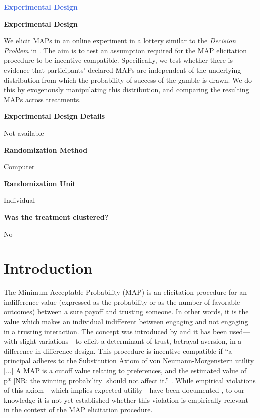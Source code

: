 \large \noindent \textcolor{RoyalBlue}{\textbf{Experimental Design}}

\normalsize \noindent \textcolor{NavyBlue}{\textbf{Experimental Design}}

We elicit MAPs in an online experiment in a lottery similar to the \textit{Decision Problem} in \cite{Bohnet2004}.
The aim is to test an assumption required for the MAP elicitation procedure to be incentive-compatible.
Specifically, we test whether there is evidence that participants' declared MAPs are independent of the underlying distribution from which the probability of success of the gamble is drawn.
We do this by exogenously manipulating this distribution, and comparing the resulting MAPs across treatments.

\noindent \textcolor{NavyBlue}{\textbf{Experimental Design Details}}

Not available

\noindent \textcolor{NavyBlue}{\textbf{Randomization Method}}

Computer

\noindent \textcolor{NavyBlue}{\textbf{Randomization Unit}}

Individual

\noindent \textcolor{NavyBlue}{\textbf{Was the treatment clustered?}}

No




\section{Introduction}

The Minimum Acceptable Probability (MAP) is an elicitation procedure for an indifference value (expressed as the probability or as the number of favorable outcomes) between a sure payoff and trusting someone.
In other words, it is the value which makes an individual indifferent between engaging and not engaging in a trusting interaction.
The concept was introduced by \cite{Bohnet2004} and it has been used—with slight variations—to elicit a determinant of trust, betrayal aversion, in a difference-in-difference design.
This procedure is incentive compatible if ``a principal adheres to the Substitution Axiom of von Neumann-Morgenstern utility [...] A MAP is a cutoff value relating to preferences, and the estimated value of p* [NR: the winning probability] should not affect it.'' \citep[p. 298]{Bohnet2008}.
While empirical violations of this axiom---which implies expected utility---have been documented \citep[see footnote 5 on p. 275 in][for a list of studies finding empirical violations]{Li2020a}, to our knowledge it is not yet established whether this violation is empirically relevant in the context of the MAP elicitation procedure.


